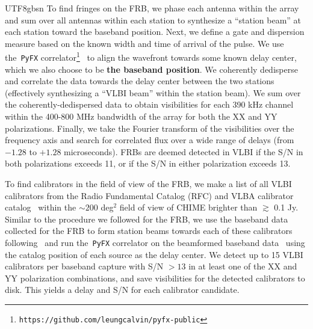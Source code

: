 \documentclass[twocolumn,linenumbers]{aastex631}
\newcommand{\msbold}[1]{\textbf{#1}}
\begin{document}
\begin{CJK*}{UTF8}{gbsn}
To find fringes on the FRB, we phase each antenna within the array and sum over all antennas within each station to synthesize a ``station beam'' at each station toward the baseband position. Next, we define a gate and dispersion measure based on the known width and time of arrival of the pulse. We use the~\texttt{PyFX} correlator\footnote{\texttt{https://github.com/leungcalvin/pyfx-public}}~\citep{leung2024vlbi} to align the wavefront towards some known delay center, which we also choose to be \msbold{the baseband position}. We coherently dedisperse and correlate the data towards the delay center between the two stations (effectively synthesizing a ``VLBI beam'' within the station beam). We sum over the coherently-dedispersed data to obtain visibilities for each 390 kHz channel within the 400-800 MHz bandwidth of the array for both the XX and YY polarizations. Finally, we take the Fourier transform of the visibilities over the frequency axis and search for correlated flux over a wide range of delays (from $-1.28$ to $+1.28$ microseconds). FRBs are deemed detected in VLBI if the S/N in both polarizations exceeds 11, or if the S/N in either polarization exceeds 13.

To find calibrators in the field of view of the FRB, we make a list of all VLBI calibrators from the Radio Fundamental Catalog (RFC) and VLBA calibrator catalog~\citep[see e.g.,][ and references therein]{ma1998international,petrov2021wide} within the $\sim 200$ deg$^2$ field of view of CHIME brighter than $\gtrsim$ 0.1 Jy. Similar to the procedure we followed for the FRB, we use the baseband data collected for the FRB to form station beams towards each of these calibrators following~\citet{andrew2024vlbi} and run the~\texttt{PyFX} correlator on the beamformed baseband data~\citep{leung2024vlbi} using the catalog position of each source as the delay center. We detect up to 15 VLBI calibrators per baseband capture with S/N $> 13$ in at least one of the XX and YY polarization combinations, and save visibilities for the detected calibrators to disk. This yields a delay and S/N for each calibrator candidate.


\end{CJK*}
\end{document}
